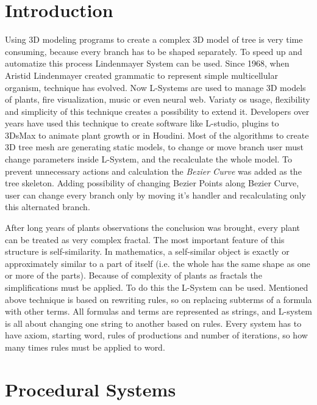 \documentclass[b5paper,twoside,11pt]{article}
\begin{document}
\section{Introduction}
Using 3D modeling programs to create a complex 3D model of tree is very time consuming, because every branch has to be shaped separately.
To speed up and automatize this process Lindenmayer System can be used. Since 1968, when Aristid Lindenmayer created  grammatic to represent simple multicellular organism, technique has evolved. Now L-Systems are used to manage 3D models of plants\cite{Herbaceus}\cite{WebTree}\cite{Spray}, fire visualization\cite{Sim}, music\cite{MLSystem} or even neural web\cite{LBrain}. Variaty os usage, flexibility and simplicity of this technique creates a possibility to extend it. Developers over years have used this technique to create software like L-studio\cite{L-Studio}, plugins to 3DsMax to animate plant growth\cite{ABartniak} or in Houdini\cite{LHoud}. Most of the algorithms to create 3D tree mesh are generating static models, to change or move branch user must change parameters inside L-System, and the recalculate the whole model. To prevent unnecessary actions and calculation the \textit{Bezier Curve} was added as the tree skeleton. Adding possibility of changing Bezier Points along Bezier Curve, user can change every branch only by moving it's handler and recalculating only this alternated branch.
\par After long years of plants observations the conclusion was brought, every plant can be treated as very complex fractal. The most important feature of this structure is self-similarity. In mathematics, a self-similar object is exactly or approximately similar to a part of itself (i.e. the whole has the same shape as one or more of the parts)\cite{SelfSimi}. Because of complexity of plants as fractals the simplifications must be applied. To do this the L-System can be used.
Mentioned above technique is based on rewriting rules, so on replacing subterms of a formula with other terms. All formulas and terms are represented as strings, and L-system is all about changing one string to another based on rules. Every system has to have axiom, starting word, rules of productions and number of iterations, so how many times rules must be applied to word. 

\section{Procedural Systems}
\end{document}
